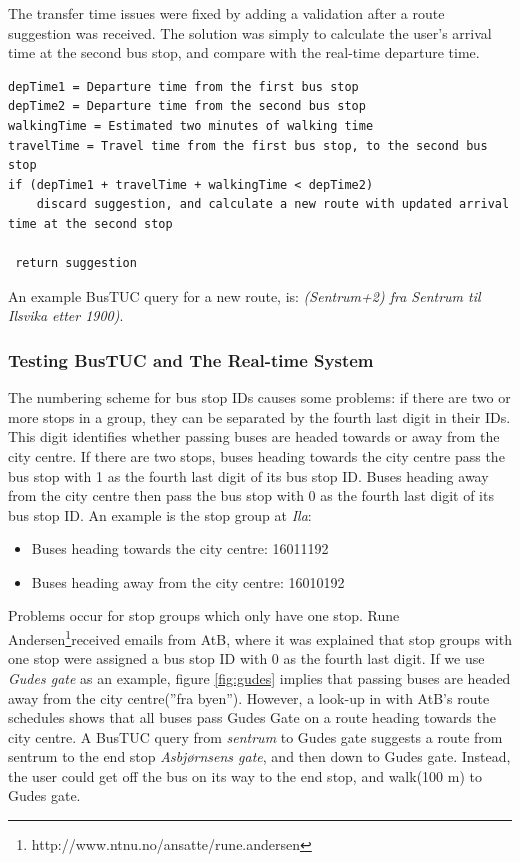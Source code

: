 The transfer time issues were fixed by adding a validation after a route suggestion was received. The solution was simply to calculate the user's arrival time at the second bus stop, and compare with the real-time departure time.
\medskip
\begin{lstlisting}[caption={Real-time query result handling with logical soundness checks}, label=transferalgorithm]
depTime1 = Departure time from the first bus stop
depTime2 = Departure time from the second bus stop
walkingTime = Estimated two minutes of walking time
travelTime = Travel time from the first bus stop, to the second bus stop 
if (depTime1 + travelTime + walkingTime < depTime2)
	discard suggestion, and calculate a new route with updated arrival time at the second stop

 return suggestion
\end{lstlisting}
An example BusTUC query for a new route, is: \emph{(Sentrum+2) fra Sentrum til Ilsvika etter 1900)}.

\subsubsection{Testing BusTUC and The Real-time System}
The numbering scheme for bus stop IDs causes some problems: if there are two or more stops in a group, they can be separated by the fourth last digit in their IDs. This digit identifies whether passing buses are headed towards or away from the city centre. If there are two stops, buses heading towards the city centre pass the bus stop with 1 as the fourth last digit of its bus stop ID. Buses heading away from the city centre then pass the bus stop with 0 as the fourth last digit of its bus stop ID. An example is the stop group at \emph{Ila}:
\begin{itemize}
\item{Buses heading towards the city centre: 16011192}
\item{Buses heading away from the city centre: 16010192}
\end{itemize}

Problems occur for stop groups which only have one stop. Rune Andersen\footnote{http://www.ntnu.no/ansatte/rune.andersen}received emails from AtB, where it was explained that stop groups with one stop were assigned a bus stop ID with 0 as the fourth last digit. If we use \emph{Gudes gate} as an example, figure \ref{fig:gudes} implies that passing buses are headed away from the city centre(''fra byen''). However, a look-up in with AtB's route schedules shows that all buses pass Gudes Gate on a route heading towards the city centre.  A BusTUC query from \emph{sentrum} to Gudes gate suggests a route from sentrum to the end stop \emph{Asbj\o rnsens gate}, and then down to Gudes gate. Instead, the user could get off the bus on its way to the end stop, and walk(100 m) to Gudes gate. 

